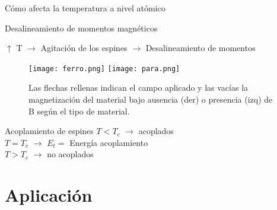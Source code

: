 \documentclass[10pt]{beamer}
\begin{document}
\begin{frame}{Cómo afecta la temperatura a nivel atómico}



\begin{block}{Desalineamiento de momentos magnéticos}
    
    $\uparrow$ T   $\rightarrow$     Agitación de los espines   $\rightarrow$     Desalineamiento de momentos

\end{block}

        \begin{figure}
            \centering
            \texttt{[image: ferro.png]} 
            \texttt{[image: para.png]}
            \caption{Las flechas rellenas indican el campo aplicado y las vacías la magnetización del material bajo ausencia (der) o presencia (izq) de B según el tipo de material.}
            \label{fig:atom}
        \end{figure}

    \begin{center}
            \begin{block}{Acoplamiento de espines}
        $T < T_c$  $\rightarrow$   acoplados \\
        $T = T_c$  $\rightarrow$  $E_t=$ Energía acoplamiento\\
        $T > T_c$  $\rightarrow$   no acoplados 
            \end{block}

    \end{center}

    



    
\end{frame}
    
\section{\textrm{Aplicación}}
       
\end{document}
